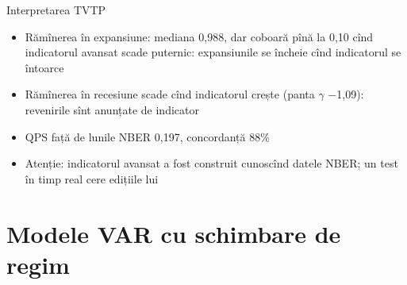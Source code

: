\begin{frame}{Interpretarea TVTP}
\itemsize{\small}
\begin{itemize}
    \item Rămînerea în expansiune: mediana 0{,}988, dar coboară pînă la 0{,}10 cînd indicatorul avansat scade puternic: expansiunile se încheie cînd indicatorul se întoarce
    \item Rămînerea în recesiune scade cînd indicatorul crește (panta $\gamma$ \ensuremath{-}1{,}09): revenirile sînt anunțate de indicator
    \item QPS față de lunile NBER 0{,}197, concordanță 88\%
    \item Atenție: indicatorul avansat a fost construit cunoscînd datele NBER; un test în timp real cere edițiile lui
\end{itemize}
\end{frame}


\section{Modele VAR cu schimbare de regim}

